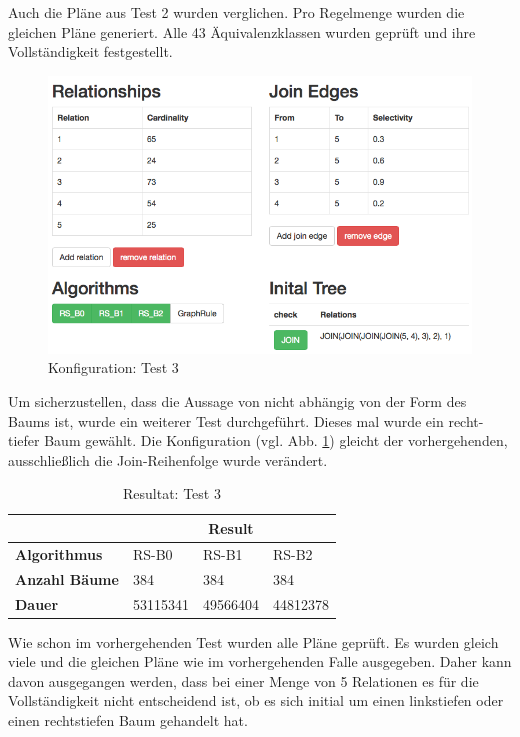 Auch die Pläne aus Test 2 wurden verglichen. Pro Regelmenge wurden die gleichen Pläne generiert. Alle 43 Äquivalenzklassen wurden geprüft und ihre Vollständigkeit festgestellt.

\begin{figure}[ht]
  \centering
  \includegraphics[width=\textwidth]{05_ResultsEvaluation/00_media/Test3.png}
  \caption{Konfiguration: Test 3}
  \label{Konfiguration:Test3}
\end{figure}


Um sicherzustellen, dass die Aussage von \cite{shanbhag2014optimizing} nicht abhängig von der Form des Baums ist, wurde ein weiterer Test durchgeführt. Dieses mal wurde ein recht-tiefer Baum gewählt. Die Konfiguration (vgl. Abb. \ref{Konfiguration:Test3}) gleicht der vorhergehenden, ausschließlich die Join-Reihenfolge wurde verändert.

\begin{table}[h]
\centering
\begin{tabular}{|l|l|l|l|}
\hline
                         & \multicolumn{3}{c|}{{\bf Result}} \\ \hline
{\bf Algorithmus}        & RS-B0     & RS-B1     & RS-B2     \\ \hline
{\bf Anzahl Bäume}       & 384       & 384       & 384       \\ \hline
{\bf Dauer}              & 53115341  & 49566404  & 44812378  \\ \hline
\end{tabular}

\caption{Resultat: Test 3}
\label{Result:Test3}
\end{table}


Wie schon im vorhergehenden Test wurden alle Pläne geprüft. Es wurden gleich viele und die gleichen Pläne wie im vorhergehenden Falle ausgegeben. Daher kann davon ausgegangen werden, dass bei einer Menge von 5 Relationen es für die Vollständigkeit nicht entscheidend  ist, ob es sich initial um einen linkstiefen oder einen rechtstiefen Baum gehandelt hat.



